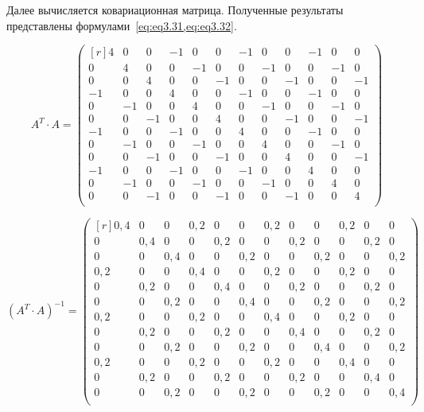 Далее вычисляется ковариационная матрица. %
Полученные результаты представлены формулами~\cref{eq:eq3.31,eq:eq3.32}.

\setcounter{MaxMatrixCols}{20}

\begin{equation} \label{eq:eq3.31}		%
A^{T}\cdot A= \begin{pmatrix*}[r] %
			 4 & 0 & 0 & -1 & 0 & 0 & -1 & 0 & 0 & -1 & 0 & 0 \\ 
			 0 & 4 & 0 & 0 & -1 & 0 & 0 & -1 & 0 & 0 & -1 & 0 \\ 
			 0 & 0 & 4 & 0 & 0 & -1 & 0 & 0 & -1 & 0 & 0 & -1 \\ 
			 -1 & 0 & 0 & 4 & 0 & 0 & -1 & 0 & 0 & -1 & 0 & 0 \\ 
			 0 & -1 & 0 & 0 & 4 & 0 & 0 & -1 & 0 & 0 & -1 & 0 \\ 
			 0 & 0 & -1 & 0 & 0 & 4 & 0 & 0 & -1 & 0 & 0 & -1 \\ 
			 -1 & 0 & 0 & -1 & 0 & 0 & 4 & 0 & 0 & -1 & 0 & 0 \\ 
			 0 & -1 & 0 & 0 & -1 & 0 & 0 & 4 & 0 & 0 & -1 & 0 \\ 
			 0 & 0 & -1 & 0 & 0 & -1 & 0 & 0 & 4 & 0 & 0 & -1 \\ 
			 -1 & 0 & 0 & -1 & 0 & 0 & -1 & 0 & 0 & 4 & 0 & 0 \\ 
			 0 & -1 & 0 & 0 & -1 & 0 & 0 & -1 &  0& 0 & 4 & 0 \\ 
			 0 & 0 & -1 & 0 & 0 & -1 & 0 & 0 & -1 & 0 & 0 & 4 \\ 
		\end{pmatrix*}
\end{equation}

\begin{equation} \label{eq:eq3.32}		%
	(A^{T}\cdot A)^{-1}= \begin{pmatrix*}[r] %
		0,4 & 0 & 0 & 0,2 & 0 & 0 & 0,2 & 0 & 0 & 0,2 & 0 & 0 \\ 
		0 & 0,4 & 0 & 0 & 0,2 & 0 & 0 & 0,2 & 0 & 0 & 0,2 & 0 \\ 
		0 & 0 & 0,4 & 0 & 0 & 0,2 & 0 & 0 & 0,2 & 0 & 0 & 0,2 \\ 
		0,2 & 0 & 0 & 0,4 & 0 & 0 & 0,2 & 0 & 0 & 0,2 & 0 & 0 \\ 
		0 & 0,2 & 0 & 0 & 0,4 & 0 & 0 & 0,2 & 0 & 0 & 0,2 & 0 \\ 
		0 & 0 & 0,2 & 0 & 0 & 0,4 & 0 & 0 & 0,2 & 0 & 0 & 0,2 \\ 
		0,2 & 0 & 0 & 0,2 & 0 & 0 & 0,4 & 0 & 0 & 0,2 & 0 & 0 \\ 
		0 & 0,2 & 0 & 0 & 0,2 & 0 & 0 & 0,4 & 0 & 0 & 0,2 & 0 \\ 
		0 & 0 & 0,2 & 0 & 0 & 0,2 & 0 & 0 & 0,4 & 0 & 0 & 0,2 \\ 
		0,2 & 0 & 0 & 0,2 & 0 & 0 & 0,2 & 0 & 0 & 0,4 & 0 & 0 \\ 
		0 & 0,2 & 0 & 0 & 0,2 & 0 & 0 & 0,2 &  0& 0 & 0,4 & 0 \\ 
		0 & 0 & 0,2 & 0 & 0 & 0,2 & 0 & 0 & 0,2 & 0 & 0 & 0,4 \\ 
	\end{pmatrix*}
\end{equation}

